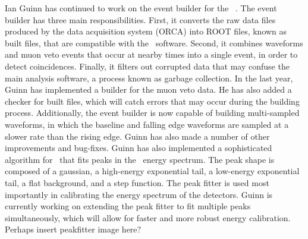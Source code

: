 Ian Guinn has continued to work on the event builder for the \MJ\ \MJDemo. The event builder has three main responsibilities. First, it converts the raw data files produced by the data acquisition system (ORCA) into ROOT files, known as built files, that are compatible with the \MJ\ software. Second, it combines waveforms and muon veto events that occur at nearby times into a single event, in order to detect coincidences. Finally, it filters out corrupted data that may confuse the main analysis software, a process known as garbage collection. In the last year, Guinn has implemented a builder for the muon veto data. He has also added a checker for built files, which will catch errors that may occur during the building process. Additionally, the event builder is now capable of building multi-sampled waveforms, in which the baseline and falling edge waveforms are sampled at a slower rate than the rising edge. Guinn has also made a number of other improvements and bug-fixes.\newline
\indent Guinn has also implemented a sophisticated algorithm for \MJ\ that fits peaks in the \MJDemo\ energy spectrum. The peak shape is composed of a gaussian, a high-energy exponential tail, a low-energy exponential tail, a flat background, and a step function. The peak fitter is used most importantly in calibrating the energy spectrum of the detectors. Guinn is currently working on extending the peak fitter to fit multiple peaks simultaneously, which will allow for faster and more robust energy calibration. Perhaps insert peakfitter image here?
%
%
%
%
%
%
%
%
%
%
%

